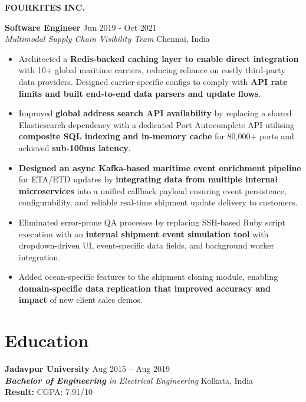\documentclass[11pt,a4paper]{article}
\newcommand{\companyheader}[1]{%
    \vspace{3pt}%
    {\Large\bfseries #1}%
    \vspace{3pt}%
}
\newcommand{\roleblock}[5]{%
    \vspace{2pt}%
    \noindent%
    \textbf{#1} \hfill #2 \\%
    \textit{#3} \hfill #4 \vspace{3pt}%
    \begin{itemize}[%
        leftmargin=*,%
        noitemsep,%
        topsep=1pt,%
        label={\small\textbullet},%
        itemsep=0pt%
    ]%
    \RaggedRight%
    \def\baselinestretch{1.0}%
        #5%
    \end{itemize}%
    \vspace{1pt}%
}
\begin{document}
\vspace{2pt}

\companyheader{FOURKITES INC.}

\roleblock
{Software Engineer}
{Jun 2019 - Oct 2021}
{Multimodal Supply Chain Visibility Team}
{Chennai, India}
{
    \item Architected a \textbf{Redis-backed caching layer to enable direct integration} with 10+ global maritime carriers, reducing reliance on costly third-party data providers. Designed carrier-specific configs to comply with \textbf{API rate limits and built end-to-end data parsers and update flows}.
    \item Improved \textbf{global address search API availability} by replacing a shared Elasticsearch dependency with a dedicated Port Autocomplete API utilising \textbf{composite SQL indexing and in-memory cache} for 80,000+ ports and achieved \textbf{sub-100ms latency}.
    \item \textbf{Designed an async Kafka-based maritime event enrichment pipeline} for ETA/ETD updates by \textbf{integrating data from multiple internal microservices} into a unified callback payload ensuring event persistence, configurability, and reliable real-time shipment update delivery to customers.
    \item Eliminated error-prone QA processes by replacing SSH-based Ruby script execution with an \textbf{internal shipment event simulation tool} with dropdown-driven UI, event-specific data fields, and background worker integration.
    \item Added ocean-specific features to the shipment cloning module, enabling \textbf{domain-specific data replication that improved accuracy and impact} of new client sales demos.
}

\vspace{4pt}

\section{Education}
{\Large\textbf{Jadavpur University}} \hfill Aug 2015 -- Aug 2019 \\
\textit{\textbf{Bachelor of Engineering} in Electrical Engineering} \hfill Kolkata, India \\ 
\textbf{Result:} CGPA: 7.91/10
\end{document}
